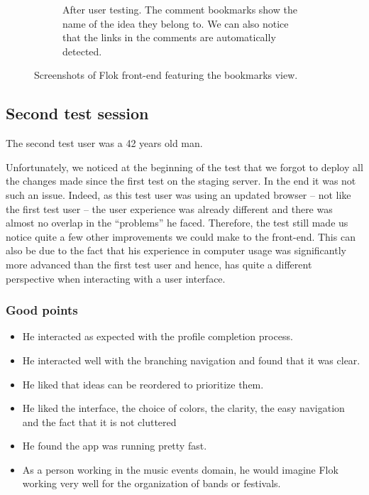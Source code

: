 \documentclass[a4paper,12pt, oneside]{article}
\begin{document}
\begin{figure}[!htb]
\begin{subfigure}[t]{.495\textwidth}
        \caption{After user testing. The comment bookmarks show the name of the idea they belong to. We can also notice that the links in the comments are automatically detected.}
        \label{fig.tests.bookmarks.after}
    \end{subfigure}
    \caption{Screenshots of Flok front-end featuring the bookmarks view.}
    \label{fig.tests.bookmarks}
\end{figure}

\FloatBarrier
\subsection{Second test session}
The second test user was a 42 years old man.

Unfortunately, we noticed at the beginning of the test that we forgot to deploy all the changes made since the first test on the staging server.
In the end it was not such an issue.
Indeed, as this test user was using an updated browser – not like the first test user – the user experience was already different and there was almost no overlap in the “problems” he faced.
Therefore, the test still made us notice quite a few other improvements we could make to the front-end.
This can also be due to the fact that his experience in computer usage was significantly more advanced than the first test user and hence, has quite a different perspective when interacting with a user interface.

\subsubsection*{Good points}
\begin{itemize}
    \item He interacted as expected with the profile completion process.
    \item He interacted well with the branching navigation and found that it was clear.
    \item He liked that ideas can be reordered to prioritize them.
    \item He liked the interface, the choice of colors, the clarity, the easy navigation and the fact that it is not cluttered
    \item He found the app was running pretty fast.
    \item As a person working in the music events domain, he would imagine Flok working very well for the organization of bands or festivals.
\end{itemize}
\end{document}
